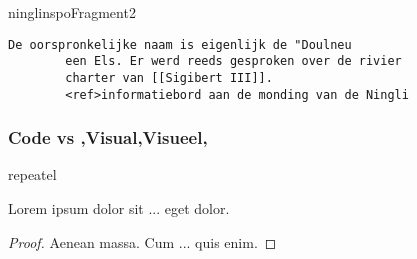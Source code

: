 \documentclass[../presentatie.tex]{subfiles}
\def\named#1{}
\begin{document}
    \begin{saveblock}{ninglinspoFragment2}
        \begin{Verbatim}[tabsize=4,gobble=8]
        De oorspronkelijke naam is eigenlijk de "Doulneu
        een Els. Er werd reeds gesproken over de rivier
        charter van [[Sigibert III]].
        <ref>informatiebord aan de monding van de Ningli
        \end{Verbatim}
    \end{saveblock}

    \begin{frame}
        \frametitle{Code vs \lang,Visual,Visueel,}

        \vspace{5pt}

    \end{frame}


    \named{intro-visueelcomp-lemmaproof}

    \begin{saveblock}{repeatel}
        \begin{highlightblock}[linewidth=0.5\textwidth,gobble=12]
            \begin{lemma}
                Lorem ipsum dolor sit
                ... eget dolor.
                
                \begin{proof}
                    Aenean massa. Cum
                    ... quis enim.
                \end{proof}
            \end{lemma}
        \end{highlightblock}
    \end{saveblock}
\end{document}
